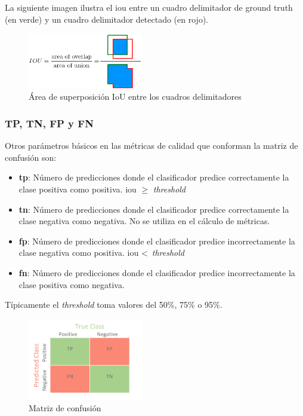 La siguiente imagen ilustra el \gls{iou} entre un cuadro delimitador de ground truth (en verde) y un cuadro delimitador detectado (en rojo).

\begin{figure}[ht]
\centering
\includegraphics[width=0.45\textwidth]{img/chapters/resultados/metricas/iou.png}
\caption{\label{fig:iou}Área de superposición IoU entre los cuadros delimitadores}
\end{figure}

\subsubsection{TP, TN, FP y FN}
\label{subsubsec:tp+tn+fp+fn}

Otros parámetros básicos en las métricas de calidad que conforman la matriz de confusión \cite{confusion-matrix} son:

\begin{itemize}
    \item \textbf{\gls{tp}}: Número de predicciones donde el clasificador predice correctamente la clase positiva como positiva. \gls{iou} $\geqslant$ \textit{threshold}
    \item \textbf{\gls{tn}}: Número de predicciones donde el clasificador predice correctamente la clase negativa como negativa. No se utiliza en el cálculo de métricas.
    \item \textbf{\gls{fp}}: Número de predicciones donde el clasificador predice incorrectamente la clase negativa como positiva. \gls{iou} <\ \textit{threshold}
    \item \textbf{\gls{fn}}: Número de predicciones donde el clasificador predice incorrectamente la clase positiva como negativa.
\end{itemize}

Típicamente el \textit{threshold} toma valores del 50\%, 75\% o 95\%.

\begin{figure}[ht]
\centering
\includegraphics[width=0.45\textwidth]{img/chapters/resultados/metricas/confusion-matrix.png}
\caption{\label{fig:confusion-matrix}Matriz de confusión}
\end{figure}

